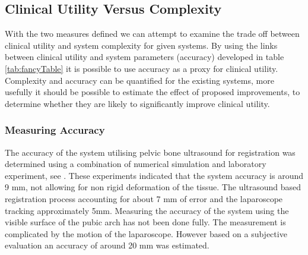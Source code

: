 \documentclass[3p,twocolumn,preprint,10pt]{elsarticle}
\begin{document}

\subsection{Clinical Utility Versus Complexity}
With the two measures defined we can attempt to examine the 
trade off between clinical utility and system complexity for given systems.
By using the links between clinical utility and system parameters (accuracy)
developed in table \ref{tab:fancyTable} it is possible to use accuracy as a proxy for
clinical utility.
Complexity and accuracy can be quantified for the existing systems, more
usefully it should be possible to estimate the effect of proposed 
improvements, to determine whether they are likely to significantly
improve clinical utility.

\subsubsection{Measuring Accuracy}



The accuracy of the system utilising pelvic bone ultrasound for registration 
was determined using a combination of numerical simulation and laboratory experiment, see 
\cite{pap280}. These experiments indicated that the system accuracy is around 9 mm, 
not allowing for non rigid deformation of the tissue.
The
ultrasound based registration process accounting for about 7 mm of error and the laparoscope 
tracking approximately 5mm. 
Measuring the accuracy of the system using the visible surface of the pubic arch has not 
been done fully. The measurement is complicated by the motion of the laparoscope. However 
based on a subjective evaluation an accuracy of around 20 mm was estimated.
\end{document}
